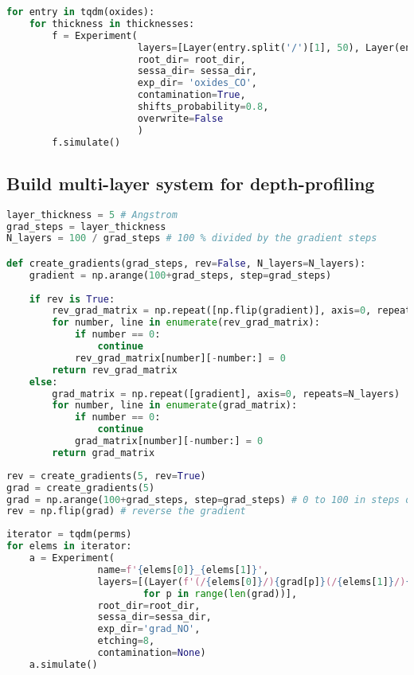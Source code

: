 \begin{lstlisting}[language=Python]
for entry in tqdm(oxides):
    for thickness in thicknesses:
        f = Experiment(
                       layers=[Layer(entry.split('/')[1], 50), Layer(entry, thickness)],
                       root_dir= root_dir,
                       sessa_dir= sessa_dir,
                       exp_dir= 'oxides_CO',
                       contamination=True,
                       shifts_probability=0.8,
                       overwrite=False
                       )
        f.simulate()
\end{lstlisting}

\hypertarget{build-multi-layer-system-for-depth-profiling}{%
\subsection{Build multi-layer system for
depth-profiling}\label{build-multi-layer-system-for-depth-profiling}}

\begin{lstlisting}[language=Python]
layer_thickness = 5 # Angstrom
grad_steps = layer_thickness
N_layers = 100 / grad_steps # 100 % divided by the gradient steps

def create_gradients(grad_steps, rev=False, N_layers=N_layers):
    gradient = np.arange(100+grad_steps, step=grad_steps)
    
    if rev is True: 
        rev_grad_matrix = np.repeat([np.flip(gradient)], axis=0, repeats=N_layers)
        for number, line in enumerate(rev_grad_matrix):
            if number == 0:
                continue
            rev_grad_matrix[number][-number:] = 0
        return rev_grad_matrix
    else:
        grad_matrix = np.repeat([gradient], axis=0, repeats=N_layers)
        for number, line in enumerate(grad_matrix):
            if number == 0:
                continue
            grad_matrix[number][-number:] = 0
        return grad_matrix
\end{lstlisting}

\begin{lstlisting}[language=Python]
rev = create_gradients(5, rev=True)
grad = create_gradients(5)
grad = np.arange(100+grad_steps, step=grad_steps) # 0 to 100 in steps of grad_steps
rev = np.flip(grad) # reverse the gradient
\end{lstlisting}

\begin{lstlisting}[language=Python]
iterator = tqdm(perms)
for elems in iterator:
    a = Experiment(
                name=f'{elems[0]}_{elems[1]}',
                layers=[(Layer(f'(/{elems[0]}/){grad[p]}(/{elems[1]}/){rev[p]}', thickness=5))
                        for p in range(len(grad))],
                root_dir=root_dir,
                sessa_dir=sessa_dir,
                exp_dir='grad_NO',
                etching=8,
                contamination=None)
    a.simulate()
\end{lstlisting}

